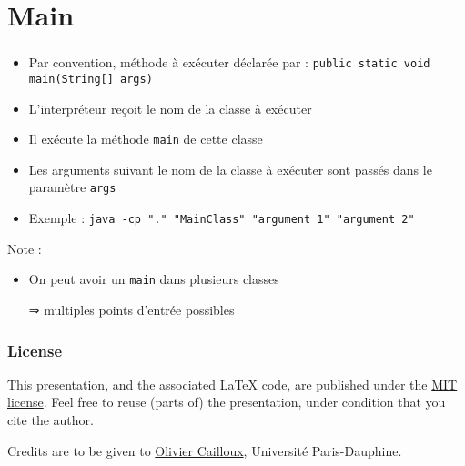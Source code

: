 \documentclass[english, french]{beamer}
\begin{document}
\section{Main}
\begin{frame}
	\frametitle{\insertsection}
	\begin{itemize}
		\item Par convention, méthode à exécuter déclarée par : \texttt{public static void main(String[] args)}
		\item L’interpréteur reçoit le nom de la classe à exécuter
		\item Il exécute la méthode \texttt{main} de cette classe
		\item Les arguments suivant le nom de la classe à exécuter sont passés dans le paramètre \texttt{args}
		\item Exemple : \texttt{java -cp "." "MainClass" "argument 1" "argument 2"}
	\end{itemize}
	Note :
	\begin{itemize}
		\item On peut avoir un \texttt{main} dans plusieurs classes
		\item[⇒] multiples points d’entrée possibles
	\end{itemize}
\end{frame}

\appendix
\makeatletter
\def\insertframenumber{\@roman\c@framenumber}
\def\inserttotalframenumber{\@roman\c@framenumber}
\makeatother

\clearpage{}
\begin{frame}[plain]
	\frametitle{License}
	This presentation, and the associated \LaTeX{} code, are published under the \href{https://opensource.org/licenses/MIT}{MIT license}. Feel free to reuse (parts of) the presentation, under condition that you cite the author.
	
	Credits are to be given to \href{http://www.lamsade.dauphine.fr/~ocailloux/}{Olivier Cailloux}, Université Paris-Dauphine.
\end{frame}
\addtocounter{framenumber}{-1}
\end{document}
